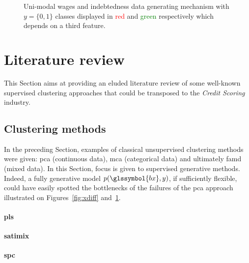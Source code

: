 \begin{figure}
\caption{\label{fig:ydiff} Uni-modal wages and indebtedness data generating mechanism with $y = \{0,1\}$ classes displayed in \textcolor{red}{red} and \textcolor{green}{green} respectively which depends on a third feature.}
\end{figure}








\section{Literature review} \label{sec:literature}

This Section aims at providing an eluded literature review of some well-known supervised clustering approaches that could be transposed to the \textit{Credit Scoring} industry.

\subsection{Clustering methods}

In the preceding Section, examples of classical unsupervised clustering methods were given: \gls{pca} (continuous data), \gls{mca} (categorical data) and ultimately \gls{famd} (mixed data). In this Section, focus is given to supervised generative methods. Indeed, a fully generative model $p(\glssymbol{bx},y)$, if sufficiently flexible, could have easily spotted the bottlenecks of the failures of the \gls{pca} approach illustrated on Figures~\ref{fig:xdiff} and~\ref{fig:ydiff}.

\paragraph{\gls{pls}}



\paragraph{\gls{satimix}}



\paragraph{\gls{spc}}



